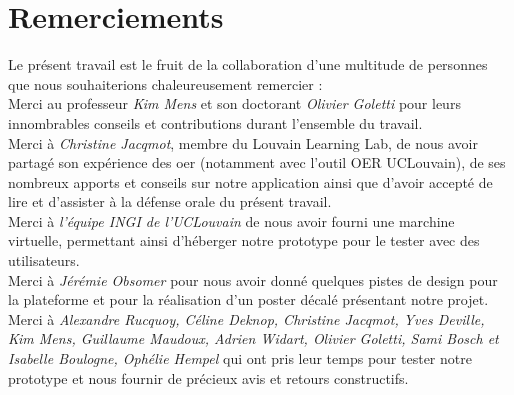 \chapter*{Remerciements}

Le présent travail est le fruit de la collaboration d'une multitude de personnes que nous souhaiterions chaleureusement remercier : \\

Merci au professeur \textit{Kim Mens} et son doctorant \textit{Olivier Goletti} pour leurs innombrables conseils et contributions durant l'ensemble du travail. \\

Merci à \textit{Christine Jacqmot}, membre du Louvain Learning Lab, de nous avoir partagé son expérience des \Gls{oer} (notamment avec l'outil OER UCLouvain), de ses nombreux apports et conseils sur notre application ainsi que d'avoir accepté de lire et d'assister à la défense orale du présent travail.\\

Merci à \textit{l'équipe INGI de l'UCLouvain} de nous avoir fourni une marchine virtuelle, permettant ainsi d'héberger notre prototype pour le tester avec des utilisateurs. \\

Merci à \textit{Jérémie Obsomer} pour nous avoir donné quelques pistes de design pour la plateforme et pour la réalisation d'un poster décalé  présentant notre projet.\\

Merci à \textit{Alexandre Rucquoy, Céline Deknop, Christine Jacqmot, Yves Deville, Kim Mens, Guillaume Maudoux, Adrien Widart, Olivier Goletti, Sami Bosch et Isabelle Boulogne, Ophélie Hempel} qui ont pris leur temps pour tester notre prototype et nous fournir de précieux avis et retours constructifs.